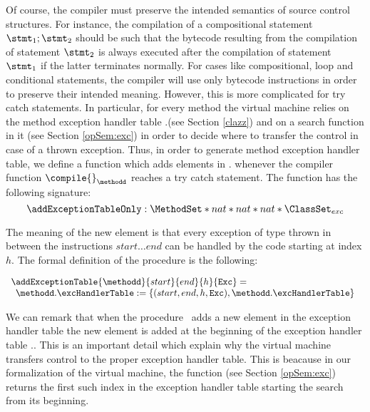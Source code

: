  Of course, the compiler must  preserve the intended semantics of source control structures. For instance,
 the compilation of a compositional statement $\stmt_1;\stmt_2$ should be such that the bytecode resulting from
 the compilation of statement $\stmt_2$ is always executed after the compilation 
 of statement $\stmt_1$ if the latter terminates normally.  For cases like compositional, loop and conditional statements, the compiler will use only bytecode instructions
 in order to preserve their intended meaning. However, this is more complicated for try catch statements. 
 In particular, for every method \methodd{} the virtual machine 
 relies on the method exception handler table  \methodd.\excHandlerTable{}(see Section \ref{clazz}) and on a search function  in it 
\findExcHandlerOnly{}(see Section \ref{opSem:exc})
 in order to decide where  to transfer the control in case of a thrown exception. Thus, in order to generate method exception handler table,
 we define a function \addExceptionTableOnly{} which adds elements in \methodd.\excHandlerTable{} whenever the compiler function $\compile{}_{\methodd}$
 reaches a try catch statement. The function has the following signature:
 $$ \addExceptionTableOnly : \MethodSet *  nat * nat * nat *  \ClassSet_{exc}   $$

 The meaning of the new element is that	every exception of type \Exc{} thrown in between the instructions
 $start \ldots end$ can be handled by the code starting at index $h$.	
 The formal definition of the procedure is the following:

$$ \begin{array}{l}
  \addExceptionTable{\methodd}{ start }{ end  }{ h}{  \mbox{\rm\texttt{Exc}} }  = \\
   \begin{array}{l}
         \methodd.\excHandlerTable := \{ (start, end, h,  \mbox{\rm\texttt{Exc}}   ) , \methodd.\excHandlerTable \}

   \end{array}
\end{array}$$


 We can remark that when the procedure  \addExceptionTableOnly \  adds a new element in the exception handler table the new element is added at the beginning of the 
 exception handler table   \methodd.\excHandlerTable.  This is an important detail which explain why the virtual machine  transfers control to the proper exception
 handler table. This is beacause in our formalization of the virtual machine, the function  \findExcHandlerOnly{}(see Section \ref{opSem:exc})
 returns the first  such index in the exception handler table  \excHandlerTable{} starting the search from its beginning.

